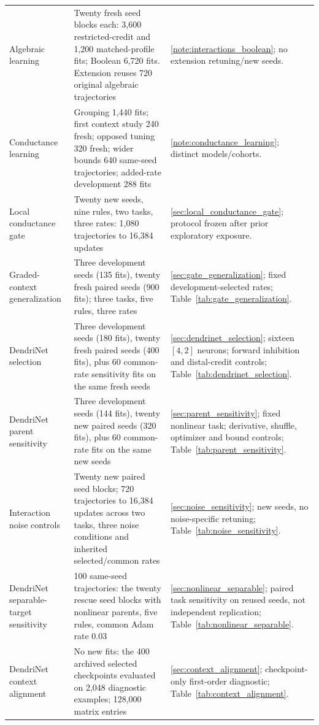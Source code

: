 \begin{longtable}{p{}p{}p{}}
Algebraic learning & Twenty fresh seed blocks each: 3,600 restricted-credit and 1,200 matched-profile fits; Boolean 6,720 fits. Extension reuses 720 original algebraic trajectories & \ref{note:interactions_boolean}; no extension retuning/new seeds. \\
Conductance learning & Grouping 1,440 fits; first context study 240 fresh; opposed tuning 320 fresh; wider bounds 640 same-seed trajectories; added-rate development 288 fits & \ref{note:conductance_learning}; distinct models/cohorts. \\
Local conductance gate & Twenty new seeds, nine rules, two tasks, three rates: 1,080 trajectories to 16,384 updates & \ref{sec:local_conductance_gate}; protocol frozen after prior exploratory exposure. \\
Graded-context generalization & Three development seeds (135 fits), twenty fresh paired seeds (900 fits); three tasks, five rules, three rates & \ref{sec:gate_generalization}; fixed development-selected rates; Table~\ref{tab:gate_generalization}. \\
DendriNet selection & Three development seeds (180 fits), twenty fresh paired seeds (400 fits), plus 60 common-rate sensitivity fits on the same fresh seeds & \ref{sec:dendrinet_selection}; sixteen $[4,2]$ neurons; forward inhibition and distal-credit controls; Table~\ref{tab:dendrinet_selection}. \\
DendriNet parent sensitivity & Three development seeds (144 fits), twenty new paired seeds (320 fits), plus 60 common-rate fits on the same new seeds & \ref{sec:parent_sensitivity}; fixed nonlinear task; derivative, shuffle, optimizer and bound controls; Table~\ref{tab:parent_sensitivity}. \\
Interaction noise controls & Twenty new paired seed blocks; 720 trajectories to 16,384 updates across two tasks, three noise conditions and inherited selected/common rates & \ref{sec:noise_sensitivity}; new seeds, no noise-specific retuning; Table~\ref{tab:noise_sensitivity}. \\
DendriNet separable-target sensitivity & 100 same-seed trajectories: the twenty rescue seed blocks with nonlinear parents, five rules, common Adam rate 0.03 & \ref{sec:nonlinear_separable}; paired task sensitivity on reused seeds, not independent replication; Table~\ref{tab:nonlinear_separable}. \\
DendriNet context alignment & No new fits: the 400 archived selected checkpoints evaluated on 2,048 diagnostic examples; 128,000 matrix entries & \ref{sec:context_alignment}; checkpoint-only first-order diagnostic; Table~\ref{tab:context_alignment}. \\

\end{longtable}
